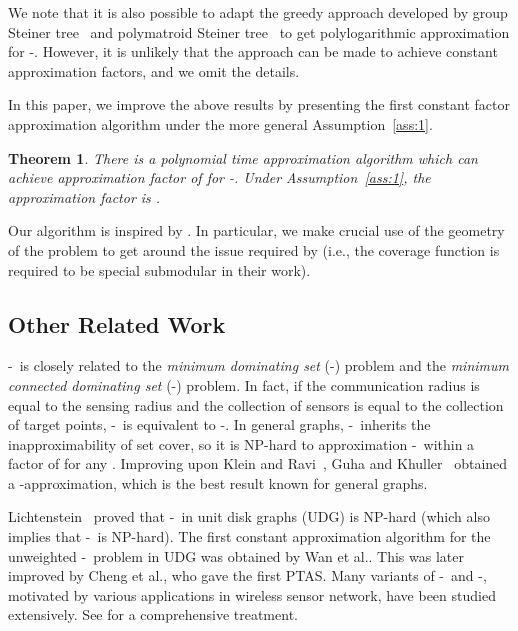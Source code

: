 \documentclass[11pt]{article}
\newcommand{\rednote}[1]{#1}
\newcommand{\mincsc}{-}
\newcommand{\mincds}{-}
\newcommand{\minds}{-}
\newcommand{\bcsc}{-}
\newtheorem{theorem}{Theorem}
\begin{document}
We note that it is also possible to adapt the greedy approach developed by group Steiner tree~\cite{chekuri2006greedy} and
polymatroid Steiner tree~\cite{calinescu2005polymatroid} to get polylogarithmic approximation
for \bcsc. However, it is unlikely that the approach can be made to achieve constant approximation
factors, and we omit the details.

In this paper, we improve the above results by presenting the first constant
factor approximation algorithm under the more general Assumption~\ref{ass:1}.

\begin{theorem}
	There is a polynomial time approximation algorithm which can achieve
	approximation factor of  for \bcsc.
	Under Assumption~\ref{ass:1}, the approximation factor is .
	\label{th_bcsc}
\end{theorem}

Our algorithm is inspired by \cite{khuller2014analyzing}.
In particular, we make crucial use of the geometry of the problem
to get around the issue required by \cite{khuller2014analyzing}
(i.e., the coverage function is required to be special submodular in their work).

\vspace{-0.2cm}
\subsection{Other Related Work}
\vspace{-0.1cm}


\mincsc\ is closely related to
the {\em minimum dominating set} (\minds) problem
and the {\em minimum connected dominating set} (\mincds) problem.
In fact, if the communication radius  is equal to the sensing radius  and the collection  of sensors is equal to the collection  of target points,
\mincsc\ is equivalent to \mincds.
In general graphs, \mincds\ inherits the inapproximability of set cover, so it is NP-hard to approximation \mincds\ within a factor of  for any  \cite{feige1998threshold,dinur2014analytical}.
Improving upon Klein and Ravi~\cite{klein1995nearly}, Guha and Khuller~\cite{guha1999improved} obtained a
-approximation, which is the best result known for general graphs.

Lichtenstein~\cite{lichtenstein1982planar} proved that \mincds\ in unit disk graphs (UDG) is NP-hard (which also implies that \mincsc\ is NP-hard).
The first constant approximation algorithm for the unweighted \mincds\ problem in UDG
was \rednote{obtained} by Wan et al.\cite{wan2002distributed}.
This was later improved by Cheng et al.\cite{cheng2003polynomial}, who gave the first PTAS.
Many variants of \minds\ and \mincds, motivated by various applications in wireless sensor network, 
have been studied extensively. See \cite{du2012connected} for a comprehensive treatment.
\end{document}
